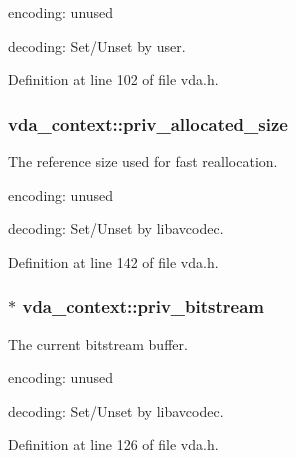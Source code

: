 \begin{DoxyItemize}
\item encoding\+: unused
\item decoding\+: Set/\+Unset by user. 
\end{DoxyItemize}

Definition at line 102 of file vda.\+h.

\subsubsection[{\texorpdfstring{priv\+\_\+allocated\+\_\+size}{priv_allocated_size}}]{ vda\+\_\+context\+::priv\+\_\+allocated\+\_\+size}\hypertarget{structvda__context_a4c3ea7e9a9286d2579f41915337fe229}{}\label{structvda__context_a4c3ea7e9a9286d2579f41915337fe229}
The reference size used for fast reallocation.


\begin{DoxyItemize}
\item encoding\+: unused
\item decoding\+: Set/\+Unset by libavcodec. 
\end{DoxyItemize}

Definition at line 142 of file vda.\+h.

\subsubsection[{\texorpdfstring{priv\+\_\+bitstream}{priv_bitstream}}]{$\ast$ vda\+\_\+context\+::priv\+\_\+bitstream}\hypertarget{structvda__context_a46bbc8f32ea0b46e98e04bfa3a15a141}{}\label{structvda__context_a46bbc8f32ea0b46e98e04bfa3a15a141}
The current bitstream buffer.


\begin{DoxyItemize}
\item encoding\+: unused
\item decoding\+: Set/\+Unset by libavcodec. 
\end{DoxyItemize}

Definition at line 126 of file vda.\+h.

